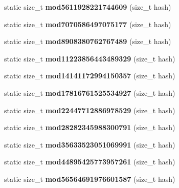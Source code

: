 \begin{DoxyCompactItemize}
\item 
static size\+\_\+t {\bfseries mod5611928221744609} (size\+\_\+t hash)\label{structska_1_1prime__number__hash__policy_a31efd844e9056b174727123a8496ebba}

\item 
static size\+\_\+t {\bfseries mod7070586497075177} (size\+\_\+t hash)\label{structska_1_1prime__number__hash__policy_a5c7b7f3fe0c28aa2ee33bfc849217a44}

\item 
static size\+\_\+t {\bfseries mod8908380762767489} (size\+\_\+t hash)\label{structska_1_1prime__number__hash__policy_aa5a9c3debbcb54db47eafcece3b53f2c}

\item 
static size\+\_\+t {\bfseries mod11223856443489329} (size\+\_\+t hash)\label{structska_1_1prime__number__hash__policy_a9d12f72e26fe2e315c113e1f4879939d}

\item 
static size\+\_\+t {\bfseries mod14141172994150357} (size\+\_\+t hash)\label{structska_1_1prime__number__hash__policy_adcd2db337628ae6eda8251b12090cec6}

\item 
static size\+\_\+t {\bfseries mod17816761525534927} (size\+\_\+t hash)\label{structska_1_1prime__number__hash__policy_a2e0b3e67f5097b6635df3cf96a96e7df}

\item 
static size\+\_\+t {\bfseries mod22447712886978529} (size\+\_\+t hash)\label{structska_1_1prime__number__hash__policy_a85f8bb5270818f96e8744600f1c64069}

\item 
static size\+\_\+t {\bfseries mod28282345988300791} (size\+\_\+t hash)\label{structska_1_1prime__number__hash__policy_a707babb79d4e52f9be79475f6e2a0c35}

\item 
static size\+\_\+t {\bfseries mod35633523051069991} (size\+\_\+t hash)\label{structska_1_1prime__number__hash__policy_aed2caeb52a22b21f4839e80b56c3f126}

\item 
static size\+\_\+t {\bfseries mod44895425773957261} (size\+\_\+t hash)\label{structska_1_1prime__number__hash__policy_acd5a9a2723309ef57340744f55acb4f9}

\item 
static size\+\_\+t {\bfseries mod56564691976601587} (size\+\_\+t hash)\label{structska_1_1prime__number__hash__policy_a32ce8e03ac6799f8e020e52e96a30bbd}


\end{DoxyCompactItemize}
